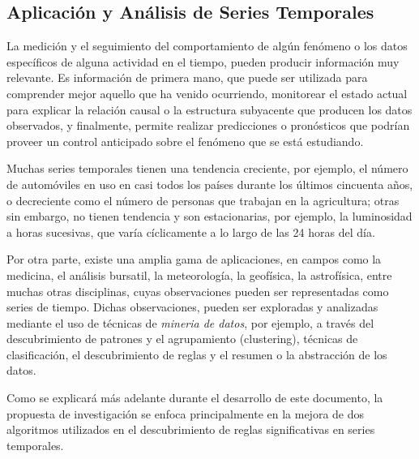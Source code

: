 \subsection{Aplicaci\'on y An\'alisis de Series Temporales}
La medici\'on y el seguimiento del comportamiento de alg\'un fen\'omeno o los datos espec\'ificos de alguna actividad en el tiempo, pueden producir informaci\'on muy relevante. Es informaci\'on de primera mano, que puede ser utilizada para comprender mejor aquello que ha venido ocurriendo, monitorear el estado actual para explicar la relaci\'on causal o la estructura subyacente que producen los datos observados, y finalmente, permite realizar predicciones o pron\'osticos que podr\'ian proveer un control anticipado sobre el fen\'omeno que se est\'a estudiando.\par
Muchas series temporales tienen una tendencia creciente, por ejemplo, el n\'umero de autom\'oviles en uso en casi todos los pa\'ises durante los \'ultimos cincuenta a\~nos, o decreciente como el n\'umero de personas que trabajan en la agricultura; otras sin embargo, no tienen tendencia y son estacionarias, por ejemplo, la luminosidad a horas sucesivas, que var\'ia c\'iclicamente a lo largo de las 24 horas del d\'ia.\par
Por otra parte, existe una amplia gama de aplicaciones, en campos como la medicina, el an\'alisis bursatil, la meteorolog\'ia, la geof\'isica, la astrof\'isica, entre muchas otras disciplinas, cuyas observaciones pueden ser representadas como series de tiempo. Dichas observaciones, pueden ser exploradas y analizadas mediante el uso de t\'ecnicas de \textit{mineria de datos}, por ejemplo, a trav\'es del descubrimiento de patrones y el agrupamiento (clustering), t\'ecnicas  de clasificaci\'on, el descubrimiento de reglas y el resumen o la abstracci\'on de los datos.\par
Como se explicar\'a m\'as adelante durante el desarrollo de este documento, la propuesta de investigaci\'on se enfoca principalmente en la mejora de dos algoritmos utilizados en el descubrimiento de reglas significativas en series temporales.
